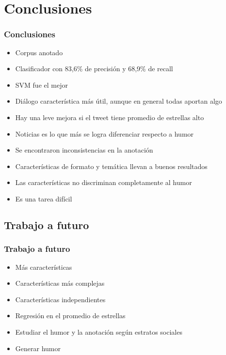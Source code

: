 \section{Conclusiones}

\begin{frame}
    \frametitle{Conclusiones}
    
    \begin{itemize}
    	\item[\checkmark] Corpus anotado
    	\item[\checkmark] Clasificador con 83,6\% de precisión y 68,9\% de recall
    	\item[\checkmark] SVM fue el mejor
    	\item[\checkmark] Diálogo característica más útil, aunque en general todas aportan algo
    	\item[\checkmark] Hay una leve mejora si el tweet tiene promedio de estrellas alto
    	\item[\checkmark] Noticias es lo que más se logra diferenciar respecto a humor
    	\item[\checkmark] Se encontraron inconsistencias en la anotación
        \item[\checkmark] Características de formato y temática llevan a buenos resultados
    	\item[\checkmark] Las características no discriminan completamente al humor
    	\item[\checkmark] Es una tarea difícil
    \end{itemize}
\end{frame}

\subsection{Trabajo a futuro}
\begin{frame}
    \frametitle{Trabajo a futuro}
    
    \begin{itemize}
        \item Más características
    	\item Características más complejas
    	\item Características independientes
    	\item Regresión en el promedio de estrellas
    	\item Estudiar el humor y la anotación según estratos sociales
        \item Generar humor
    \end{itemize}
\end{frame}
